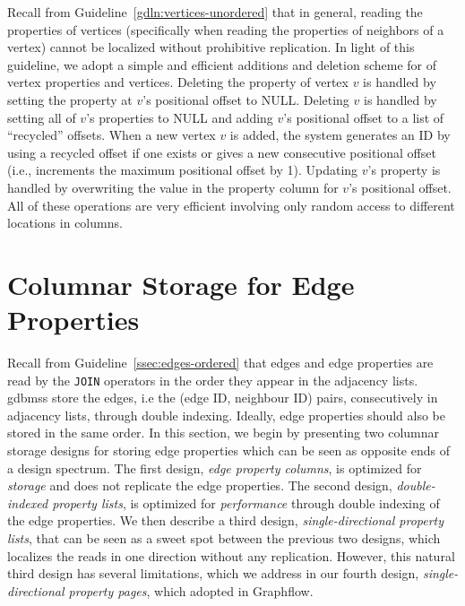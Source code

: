 
Recall from Guideline~\ref{gdln:vertices-unordered} that in general, reading the properties of vertices (specifically when reading the properties of neighbors of a vertex) cannot be localized without prohibitive replication. In light of this guideline, we adopt a simple and efficient additions and deletion scheme for of vertex properties and vertices. Deleting  the property of vertex $v$ is handled by setting the property at $v$'s positional offset to NULL.  Deleting $v$ is handled by setting all of $v$'s properties to NULL and adding $v$'s positional offset to a list of ``recycled'' offsets. When a new vertex $v$ is added, the system generates an ID by using a recycled offset if one exists or gives a new consecutive positional offset (i.e., increments the maximum positional offset by 1). Updating $v$'s property is handled by overwriting the value in the property column for $v$'s positional offset. All of these operations are very efficient involving only random access to different locations in columns.

\section{Columnar Storage for Edge Properties}
\label{sec:edge-property-columns}

Recall from Guideline~\ref{ssec:edges-ordered} that edges and edge properties  are read by the \texttt{JOIN} operators in the order they appear in the adjacency lists. \gls{gdbms}s store the edges, i.e the (edge ID, neighbour  ID) pairs, consecutively in adjacency lists, through double indexing. Ideally, edge properties should also be stored in the same order. In this section, we begin by presenting two columnar storage designs for storing edge properties which can be seen as opposite ends of a design spectrum. The first design, {\em edge property columns}, is optimized for \emph{storage} and does not replicate the edge properties. The second design, {\em double-indexed property lists}, is optimized for \emph{performance} through double indexing of the edge properties. We then describe a third design, {\em single-directional property lists}, that can be seen as a sweet spot between the previous two designs, which localizes the reads in one direction without any replication. However, this natural third design has several limitations, which we address in our fourth design, {\em single-directional property pages}, which adopted in Graphflow. 

